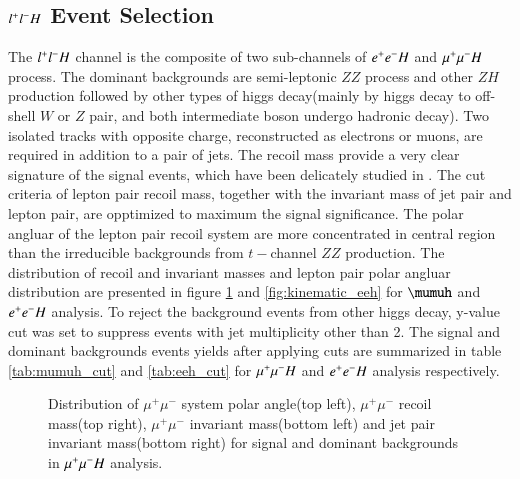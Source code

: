 \subsection{$l^{+}l^{-}H$ Event Selection}
The $l^{+}l^{-}H$ channel is the composite of two sub-channels of $e^{+}e^{-}H$ and $\mu^{+}\mu^{-}H$ process. The dominant backgrounds are semi-leptonic $ZZ$ process and other $ZH$ production followed by other types of higgs decay(mainly by higgs decay to off-shell $W$ or $Z$ pair, and both intermediate boson undergo hadronic decay).
Two isolated tracks with opposite charge, reconstructed as electrons or muons, are required in addition to a pair of jets.  The recoil mass provide a very clear signature of the signal events, which have been delicately studied in \cite{CEPC:recoilmass}. 
The cut criteria of lepton pair recoil mass, together with the invariant mass of jet pair and lepton pair, are opptimized to maximum the signal significance. 
The polar angluar of the lepton pair recoil system are more concentrated in central region than the irreducible backgrounds from $t-$channel $ZZ$ production. The distribution of recoil and invariant masses and lepton pair
polar angluar distribution are presented in figure \ref{fig:kinematic_mumuh} and 
\ref{fig:kinematic_eeh} for $\mumuh$ and $e^{+}e^{-}H$ analysis.
To reject the background events from other higgs decay, y-value cut was set to suppress events with jet multiplicity other than 2. The signal and dominant backgrounds events yields after applying cuts are summarized in table \ref{tab:mumuh_cut} and \ref{tab:eeh_cut} for $\mu^{+}\mu^{-}H$ and $e^{+}e^{-}H$ analysis respectively.\par


\begin{figure}[!htpb]
\label{fig:kinematic_mumuh}
\centering
{}
\caption{Distribution of $\mu^+\mu^-$ system polar angle(top left), $\mu^+\mu^-$ recoil mass(top right), $\mu^+\mu^-$ invariant mass(bottom left) and jet pair invariant mass(bottom right) for signal and dominant backgrounds in $\mu^{+}\mu^{-}H$ analysis.}
\end{figure}

